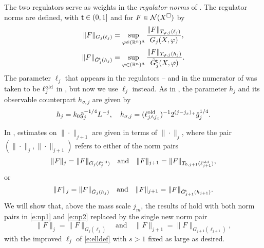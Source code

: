 The two regulators serve as weights in the \emph{regulator norms} of
\cite[Definition~\ref{IE-def:Gnorms}]{BS-rg-IE}.
The regulator norms are defined,  with ${\sf t} \in (0,1]$ and
for $F \in \mathcal{N}(X^\Box)$ by
\begin{align}
\label{e:Gnormdef1}
\| F\|_{G_j(\ell_j)}
	&=
\sup_{\varphi \in ({\mathbb R}^n)^\Lambda}
\frac{\|F\|_{T_{\varphi,j}(\ell_j)}}{G_{j}(X,\varphi)}
,
	\\
\label{e:Gnormdef2}
\|F\|_{\tilde G_j^{{\sf t}}(h_j)}
	&=
\sup_{\varphi \in ({\mathbb R}^n)^\Lambda}
\frac{\|F \|_{T_{\varphi,j}(h_j)}}{\tilde{G}^{{\sf t}}_{j}(X,\varphi)}
.
\end{align}
The parameter $\ell_j$ that appears in the regulators -- and
in the numerator of  was taken to be $\ell_j^{\mathrm{old}}$ in \cite{BS-rg-IE},
but now we use $\ell_j$ instead. As in \cite{BS-rg-IE},
the parameter $h_j$ and its observable counterpart $h_{\sigma,j}$ are given by
\begin{equation}
\label{e:h}
h_{j} = k_0 \tilde{g}_j^{-1/4}L^{-j},
	\quad
h_{\sigma,j}  = (\ell_{j \wedge j_{x}}^{\rm old})^{-1}
2^{(j - j_{x})_+}\tilde{g}_j^{1/4}.
\end{equation}

In \cite{BS-rg-IE}, estimates on $\|\cdot\|_{j+1}$ are given in terms of
$\|\cdot\|_j$, where the pair $(\|\cdot\|_j, \|\cdot\|_{j+1})$ refers to
either of the norm pairs
\begin{equation}
\label{e:np1}
    \|F\|_j = \|F\|_{G_j(\ell_j^{\mathrm{old}})}
    \quad \text{and} \quad
    \|F\|_{j+1} = \|F\|_{T_{0,j+1}(\ell_{j+1}^{\mathrm{old}})},
\end{equation}
or
\begin{equation}
\label{e:np2}
    \|F\|_j = \|F\|_{\tilde{G}_j(h_j)}
    \quad \text{and} \quad
    \|F\|_{j+1} = \|F\|_{\tilde{G}_{j+1}^{{\sf t}}(h_{j+1})}.
\end{equation}
We will show that, above the mass scale $j_m$, the results of \cite{BS-rg-IE} hold with
both norm pairs in \eqref{e:np1} and \eqref{e:np2} replaced by the single new norm pair
\begin{equation}
\label{e:npmass}
    \|F\|_j = \|F\|_{G_j(\ell_j)}
    \quad \text{and} \quad
    \|F\|_{j+1} = \|F\|_{G_{j+1}(\ell_{j+1})},
\end{equation}
with the improved $\ell_j$ of \eqref{e:elldef} with $s > 1$ fixed as large as desired.

